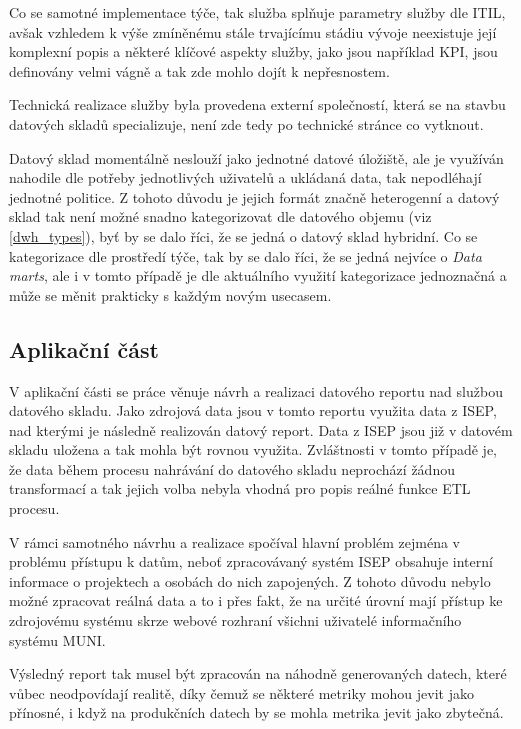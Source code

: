 \documentclass[
  digital,     %
  twoside,     %
  lof,         %
  lot,         %
]{fithesis4}
\begin{document}
Co se samotné implementace týče, tak služba splňuje parametry služby dle ITIL, avšak vzhledem k výše zmíněnému stále trvajícímu stádiu vývoje neexistuje její komplexní popis a některé klíčové aspekty služby, jako jsou například KPI, jsou definovány velmi vágně a tak zde mohlo dojít k nepřesnostem. 

Technická realizace služby byla provedena externí společností, která se na stavbu datových skladů specializuje, není zde tedy po technické stránce co vytknout. 

Datový sklad momentálně neslouží jako jednotné datové úložiště, ale je využíván nahodile dle potřeby jednotlivých uživatelů a ukládaná data, tak nepodléhají jednotné politice. Z tohoto důvodu  je jejich formát značně heterogenní a datový sklad tak není možné snadno kategorizovat dle datového objemu (viz \ref{dwh_types}), byť by se dalo říci, že se jedná o datový sklad hybridní. Co se kategorizace dle prostředí týče, tak by se dalo říci, že se jedná nejvíce o \emph{Data marts}, ale i v tomto případě je dle aktuálního využití kategorizace jednoznačná a může se měnit prakticky s každým novým usecasem. 

\subsection{Aplikační část}
\label{dis-appli}
V aplikační části se práce věnuje návrh a realizaci datového reportu nad službou datového skladu. Jako zdrojová data jsou v tomto reportu využita data z ISEP, nad kterými je následně realizován datový report. Data z ISEP jsou již v datovém skladu uložena a tak mohla být rovnou využita. Zvláštnosti v tomto případě je, že data během procesu nahrávání do datového skladu neprochází žádnou transformací a tak jejich volba nebyla vhodná pro popis reálné funkce ETL procesu.

V rámci samotného návrhu a realizace spočíval hlavní problém zejména v problému přístupu k datům, neboť zpracovávaný systém ISEP obsahuje interní informace o projektech a osobách do nich zapojených. Z tohoto důvodu nebylo možné zpracovat reálná data a to i přes fakt, že na určité úrovní mají přístup ke zdrojovému systému skrze webové rozhraní všichni uživatelé informačního systému MUNI. 

Výsledný report tak musel být zpracován na náhodně generovaných datech, které vůbec neodpovídají realitě, díky čemuž se některé metriky mohou jevit jako přínosné, i když na produkčních datech by se mohla metrika jevit jako zbytečná.
\end{document}

